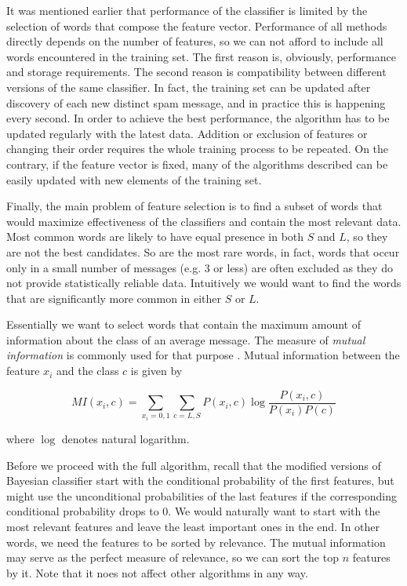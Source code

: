 \documentclass[12pt]{report}
\begin{document}
It was mentioned earlier that performance of the classifier is limited by the selection of words that compose the feature vector. Performance of all methods directly depends on the number of features, so we can not afford to include all words encountered in the training set. The first reason is, obviously, performance and storage requirements. The second reason is compatibility between different versions of the same classifier. In fact, the training set can be updated after discovery of each new distinct spam message, and in practice this is happening every second. In order to achieve the best performance, the algorithm has to be updated regularly with the latest data. Addition or exclusion of features or changing their order requires the whole training process to be repeated. On the contrary, if the feature vector is fixed, many of the algorithms described can be easily updated with new elements of the training set.

Finally, the main problem of feature selection is to find a subset of words that would maximize effectiveness of the classifiers and contain the most relevant data. Most common words are likely to have equal presence in both $S$ and $L$, so they are not the best candidates. So are the most rare words, in fact, words that occur only in a small number of messages (e.g. 3 or less) are often excluded as they do not provide statistically reliable data. Intuitively we would want to find the words that are significantly more common in either $S$ or $L$.

Essentially we want to select words that contain the maximum amount of information about the class of an average message. The measure of \textit{mutual information} is commonly used for that purpose \cite{Sahami}. Mutual information between the feature $x_i$ and the class $c$ is given by

$$MI(x_i, c) = \sum_{x_i=0,1} \sum_{c=L,S} P(x_i, c) \log \frac{P(x_i, c)}{P(x_i) P(c)}$$

where $\log$ denotes natural logarithm.

Before we proceed with the full algorithm, recall that the modified versions of Bayesian classifier start with the conditional probability of the first features, but might use the unconditional probabilities of the last features if the corresponding conditional probability drops to $0$. We would naturally want to start with the most relevant features and leave the least important ones in the end. In other words, we need the features to be sorted by relevance. The mutual information may serve as the perfect measure of relevance, so we can sort the top $n$ features by it. Note that it noes not affect other algorithms in any way.
\end{document}
